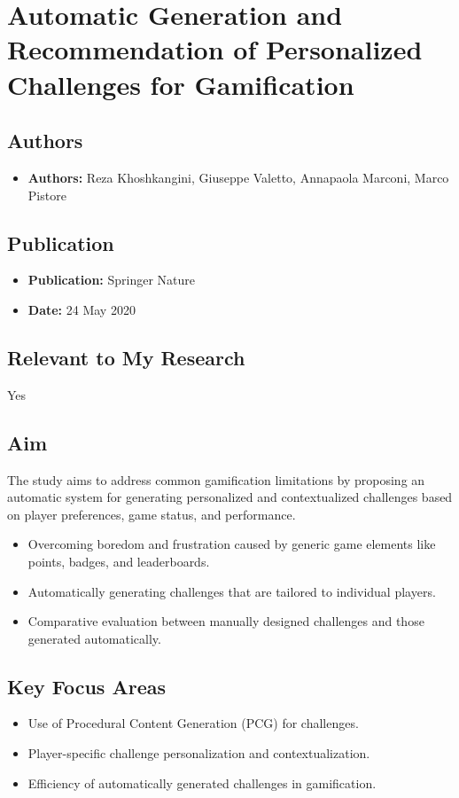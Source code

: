 \section{Automatic Generation and Recommendation of Personalized Challenges for Gamification}

\subsection{Authors}
\begin{itemize}
    \item \textbf{Authors:} Reza Khoshkangini, Giuseppe Valetto, Annapaola Marconi, Marco Pistore
\end{itemize}

\subsection{Publication}
\begin{itemize}
    \item \textbf{Publication:} Springer Nature
    \item \textbf{Date:} 24 May 2020
\end{itemize}

\subsection{Relevant to My Research}
Yes

\subsection{Aim}
The study aims to address common gamification limitations by proposing an automatic system for generating personalized and contextualized challenges based on player preferences, game status, and performance.

\begin{itemize}
    \item Overcoming boredom and frustration caused by generic game elements like points, badges, and leaderboards.
    \item Automatically generating challenges that are tailored to individual players.
    \item Comparative evaluation between manually designed challenges and those generated automatically.
\end{itemize}

\subsection{Key Focus Areas}
\begin{itemize}
    \item Use of Procedural Content Generation (PCG) for challenges.
    \item Player-specific challenge personalization and contextualization.
    \item Efficiency of automatically generated challenges in gamification.
\end{itemize}

